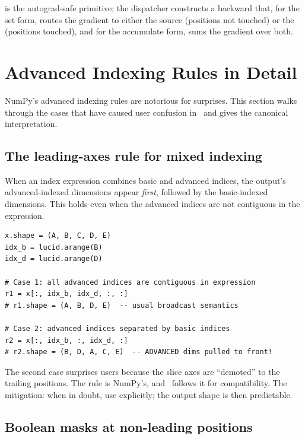  is the autograd-safe primitive; the dispatcher
constructs a backward that, for the set form, routes the gradient
to either the source  (positions not touched) or the
 (positions touched), and for the accumulate form,
sums the gradient over both.

\section{Advanced Indexing Rules in Detail}
\label{sec:indexing:advanced_rules}

NumPy's advanced indexing rules are notorious for surprises. This
section walks through the cases that have caused user confusion in
\Lucid\ and gives the canonical interpretation.

\subsection{The leading-axes rule for mixed indexing}
\label{ssec:indexing:leading_axes}

When an index expression combines basic and advanced indices, the
output's advanced-indexed dimensions appear \emph{first}, followed
by the basic-indexed dimensions. This holds even when the advanced
indices are not contiguous in the expression.

\begin{lstlisting}[style=lucid,language=LucidPython]
x.shape = (A, B, C, D, E)
idx_b = lucid.arange(B)
idx_d = lucid.arange(D)

# Case 1: all advanced indices are contiguous in expression
r1 = x[:, idx_b, idx_d, :, :]
# r1.shape = (A, B, D, E)  -- usual broadcast semantics

# Case 2: advanced indices separated by basic indices
r2 = x[:, idx_b, :, idx_d, :]
# r2.shape = (B, D, A, C, E)  -- ADVANCED dims pulled to front!
\end{lstlisting}

The second case surprises users because the slice axes are
``demoted'' to the trailing positions. The rule is NumPy's, and
\Lucid\ follows it for compatibility. The mitigation: when in
doubt, use  explicitly; the output shape is then
predictable.

\subsection{Boolean masks at non-leading positions}
\label{ssec:indexing:bool_nonlead}

